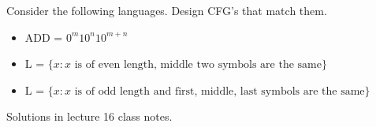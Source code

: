 \begin{example}
    
    Consider the following languages. Design CFG's that match them.
    \begin{itemize}
        \item ADD = $0^m10^n10^{m+n}$
        \item L = $\{x: \text{$x$ is of even length, middle two symbols are the same}\}$
        \item L = $\{x: \text{$x$ is of odd length and first, middle, last symbols are the same} \}$
    \end{itemize}

    Solutions in lecture 16 class notes.
\end{example}


